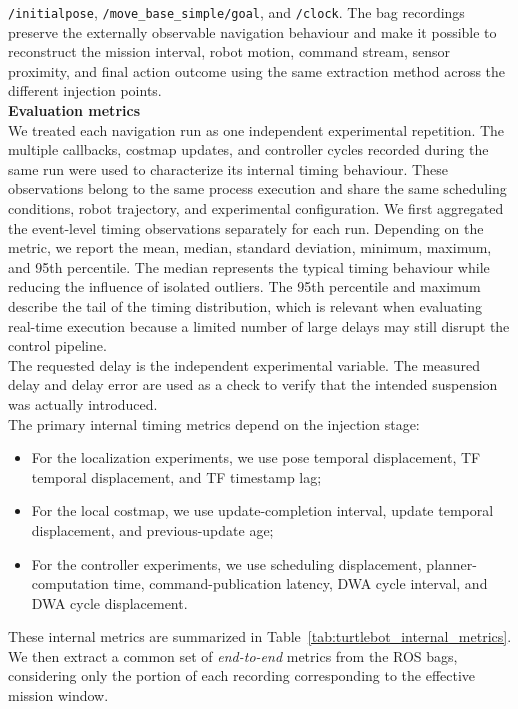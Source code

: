 \noindent \texttt{/initialpose}, \texttt{/move\_base\_simple/goal}, and \texttt{/clock}. The bag recordings preserve the externally observable navigation behaviour and make it possible to reconstruct the mission interval, robot motion, command stream, sensor proximity, and final action outcome using the same extraction method across the different injection points.
\\
\noindent \textbf{Evaluation metrics} \\
We treated each navigation run as one independent experimental repetition. The multiple callbacks, costmap updates, and controller cycles recorded during the same run were used to characterize its internal timing behaviour. These observations belong to the same process execution and share the same scheduling conditions, robot trajectory, and experimental configuration.
We first aggregated the event-level timing observations separately for each run. Depending on the metric, we report the mean, median, standard deviation, minimum, maximum, and 95th percentile. The median represents the typical timing behaviour while reducing the influence of isolated outliers. The 95th percentile and maximum describe the tail of the timing distribution, which is relevant when evaluating real-time execution because a limited number of large delays may still disrupt the control pipeline.
\\
The requested delay is the independent experimental variable. The measured delay and delay error are used as a check to verify that the intended suspension was actually introduced.
\\
The primary internal timing metrics depend on the injection stage:
\begin{itemize}[nosep]
    \item For the localization experiments, we use pose temporal displacement, TF temporal displacement, and TF timestamp lag;
    \item For the local costmap, we use update-completion interval, update temporal displacement, and previous-update age;
    \item For the controller experiments, we use scheduling displacement, planner-computation time, command-publication latency, DWA cycle interval, and DWA cycle displacement.
\end{itemize}
These internal metrics are summarized in Table~\ref{tab:turtlebot_internal_metrics}.
We then extract a common set of \textit{end-to-end} metrics from the ROS bags, considering only the portion of each recording corresponding to the effective mission window.
